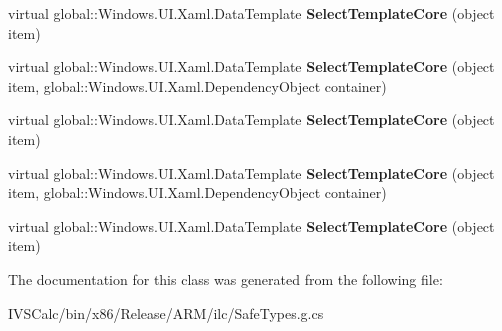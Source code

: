 \begin{DoxyCompactItemize}
virtual global\+::\+Windows.\+U\+I.\+Xaml.\+Data\+Template {\bfseries Select\+Template\+Core} (object item)
\item 
\mbox{\label{class_windows_1_1_u_i_1_1_xaml_1_1_controls_1_1_data_template_selector_a1550a78f9267fb5b27f3ddbb354bc449}} 
virtual global\+::\+Windows.\+U\+I.\+Xaml.\+Data\+Template {\bfseries Select\+Template\+Core} (object item, global\+::\+Windows.\+U\+I.\+Xaml.\+Dependency\+Object container)
\item 
\mbox{\label{class_windows_1_1_u_i_1_1_xaml_1_1_controls_1_1_data_template_selector_af652d1861b784ec9c0ef1f7c0bb53734}} 
virtual global\+::\+Windows.\+U\+I.\+Xaml.\+Data\+Template {\bfseries Select\+Template\+Core} (object item)
\item 
\mbox{\label{class_windows_1_1_u_i_1_1_xaml_1_1_controls_1_1_data_template_selector_a1550a78f9267fb5b27f3ddbb354bc449}} 
virtual global\+::\+Windows.\+U\+I.\+Xaml.\+Data\+Template {\bfseries Select\+Template\+Core} (object item, global\+::\+Windows.\+U\+I.\+Xaml.\+Dependency\+Object container)
\item 
\mbox{\label{class_windows_1_1_u_i_1_1_xaml_1_1_controls_1_1_data_template_selector_af652d1861b784ec9c0ef1f7c0bb53734}} 
virtual global\+::\+Windows.\+U\+I.\+Xaml.\+Data\+Template {\bfseries Select\+Template\+Core} (object item)
\end{DoxyCompactItemize}


The documentation for this class was generated from the following file\+:\begin{DoxyCompactItemize}
\item 
I\+V\+S\+Calc/bin/x86/\+Release/\+A\+R\+M/ilc/Safe\+Types.\+g.\+cs\end{DoxyCompactItemize}
